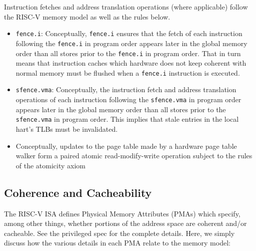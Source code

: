 Instruction fetches and address translation operations (where applicable) follow the RISC-V memory model as well as the rules below.
\begin{itemize}
  \item {\tt fence.i}: Conceptually, {\tt fence.i} ensures that the fetch of each instruction following the {\tt fence.i} in program order appears later in the global memory order than all stores prior to the {\tt fence.i} in program order.
    That in turn means that instruction caches which hardware does not keep coherent with normal memory must be flushed when a {\tt fence.i} instruction is executed.
  \item {\tt sfence.vma}: Conceptually, the instruction fetch and address translation operations of each instruction following the {\tt sfence.vma} in program order appears later in the global memory order than all stores prior to the {\tt sfence.vma} in program order.
    This implies that stale entries in the local hart's TLBs must be invalidated.
  \item Conceptually, updates to the page table made by a hardware page table walker form a paired atomic read-modify-write operation subject to the rules of the atomicity axiom
\end{itemize}

\subsection{Coherence and Cacheability}

The RISC-V ISA defines Physical Memory Attributes (PMAs) which specify, among other things, whether portions of the address space are coherent and/or cacheable.
See the privileged spec for the complete details.
Here, we simply discuss how the various details in each PMA relate to the memory model:

